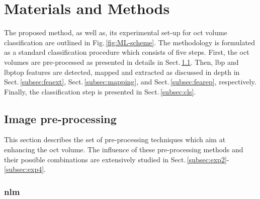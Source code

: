 \graphicspath{ {./content/method/figures/}}

\section{Materials and Methods}\label{sec:method}

The proposed method, as well as, its experimental set-up for \ac{oct} volume classification are outlined in Fig.\,\ref{fig:ML-scheme}.
The methodology is formulated as a standard classification procedure which consists of five steps.
First, the \ac{oct} volumes are pre-processed as presented in details in Sect.\,\ref{subsec:prepro}.
Then, \ac{lbp} and \ac{lbptop} features are detected, mapped and extracted as discussed in depth in Sect.\,\ref{subsec:feaext}, Sect.\,\ref{subsec:mapping}, and Sect.\,\ref{subsec:fearep}, respectively.
Finally, the classification step is presented in Sect.\,\ref{subsec:cls}.


\subsection{Image pre-processing}\label{subsec:prepro}

This section describes the set of pre-processing techniques which aim at enhancing the \ac{oct} volume.
The influence of these pre-processing methods and their possible combinations are extensively studied in Sect.\,\ref{subsec:exp2}-\ref{subsec:exp4}.

\subsubsection{\acf{nlm}}

